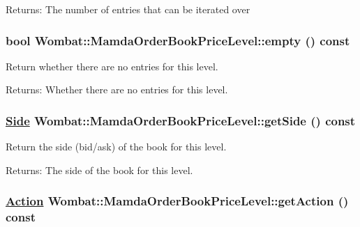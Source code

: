 \begin{Desc}
\item[Returns:]The number of entries that can be iterated over \end{Desc}
\hypertarget{classWombat_1_1MamdaOrderBookPriceLevel_cd567e85a29da243d7930767b390d795}{
\subsubsection[empty]{\setlength{\rightskip}{0pt plus 5cm}bool Wombat::Mamda\-Order\-Book\-Price\-Level::empty () const}}
\label{classWombat_1_1MamdaOrderBookPriceLevel_cd567e85a29da243d7930767b390d795}


Return whether there are no entries for this level. 

\begin{Desc}
\item[Returns:]Whether there are no entries for this level. \end{Desc}
\hypertarget{classWombat_1_1MamdaOrderBookPriceLevel_bb9667672b7ec6df0ddcd5b3887ca5de}{
\subsubsection[getSide]{\setlength{\rightskip}{0pt plus 5cm}\hyperlink{classWombat_1_1MamdaOrderBookPriceLevel_384c34b0a74d874b8969dee9b0d3718d}{Side} Wombat::Mamda\-Order\-Book\-Price\-Level::get\-Side () const}}
\label{classWombat_1_1MamdaOrderBookPriceLevel_bb9667672b7ec6df0ddcd5b3887ca5de}


Return the side (bid/ask) of the book for this level. 

\begin{Desc}
\item[Returns:]The side of the book for this level. \end{Desc}
\hypertarget{classWombat_1_1MamdaOrderBookPriceLevel_232ee2c842b179c9bf8084f0760a0674}{
\subsubsection[getAction]{\setlength{\rightskip}{0pt plus 5cm}\hyperlink{classWombat_1_1MamdaOrderBookPriceLevel_bd3407b4250fc6f7a42d94b6d32e358a}{Action} Wombat::Mamda\-Order\-Book\-Price\-Level::get\-Action () const}}
\label{classWombat_1_1MamdaOrderBookPriceLevel_232ee2c842b179c9bf8084f0760a0674}


